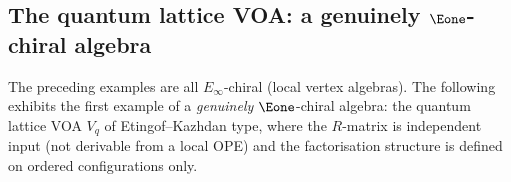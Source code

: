 \subsection{The quantum lattice VOA: a genuinely $\Eone$-chiral algebra}%
\label{subsec:quantum-lattice-voa}%
%
%

The preceding examples are all $E_\infty$-chiral (local vertex
algebras). The following exhibits the first example of a
\emph{genuinely} $\Eone$-chiral algebra: the quantum
lattice VOA $V_q$ of Etingof--Kazhdan type, where the
$R$-matrix is independent input (not derivable from a
local OPE) and the factorisation structure is defined on
ordered configurations only.

